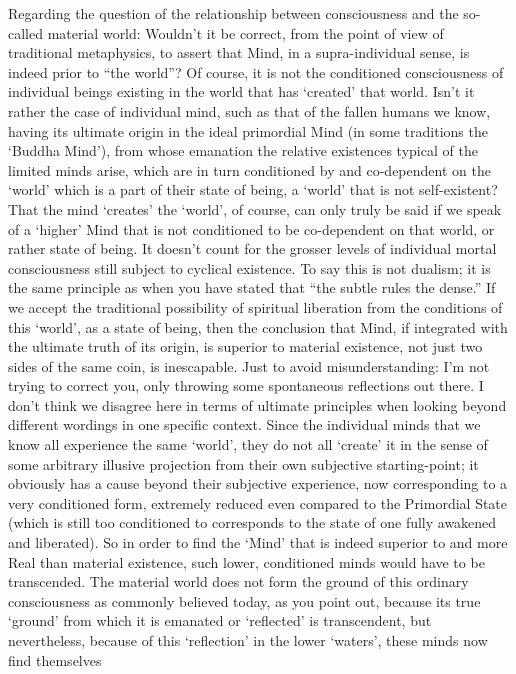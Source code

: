 \begin{footnotesize}
\begin{sffamily}
Regarding the question of the relationship between consciousness and the so-called material world: Wouldn't
it be correct, from the point of view of traditional metaphysics, to assert that Mind, in a supra-individual sense, is
indeed prior to “the world”? Of course, it is not the conditioned consciousness of individual beings existing in the
world that has `created' that world. Isn't it rather the case of individual mind,
such as that of the fallen humans we know, having its ultimate origin in the ideal primordial Mind (in some traditions
the `Buddha Mind’), from whose emanation the relative existences typical of the limited minds
arise, which are in turn conditioned by and co-dependent on the `world' which is a part of
their state of being, a `world' that is not self-existent? That the mind
`creates' the `world’, of course, can only truly be said if we speak of
a `higher' Mind that is not conditioned to be co-dependent on that world, or rather state of
being. It doesn't count for the grosser levels of individual mortal consciousness still subject to cyclical
existence. To say this is not dualism; it is the same principle as when you have stated that “the subtle rules the
dense.” If we accept the traditional possibility of spiritual liberation from the conditions of this
`world', as a state of being, then the conclusion that Mind, if integrated with the ultimate
truth of its origin, is superior to material existence, not just two sides of the same coin, is inescapable. Just to
avoid misunderstanding: I'm not trying to correct you, only throwing some spontaneous reflections out
there. I don't think we disagree here in terms of ultimate principles when looking beyond different
wordings in one specific context. Since the individual minds that we know all experience the same
`world', they do not all `create' it in the sense of some arbitrary
illusive projection from their own subjective starting-point; it obviously has a cause beyond their subjective
experience, now corresponding to a very conditioned form, extremely reduced even compared to the Primordial State
(which is still too conditioned to corresponds to the state of one fully awakened and liberated). So in order to find
the `Mind' that is indeed superior to and more Real than material existence, such lower,
conditioned minds would have to be transcended. The material world does not form the ground of this ordinary
consciousness as commonly believed today, as you point out, because its true `ground' from
which it is emanated or `reflected' is transcendent, but nevertheless, because of this
`reflection' in the lower `waters', these minds now find themselves

\end{sffamily}
\end{footnotesize}

